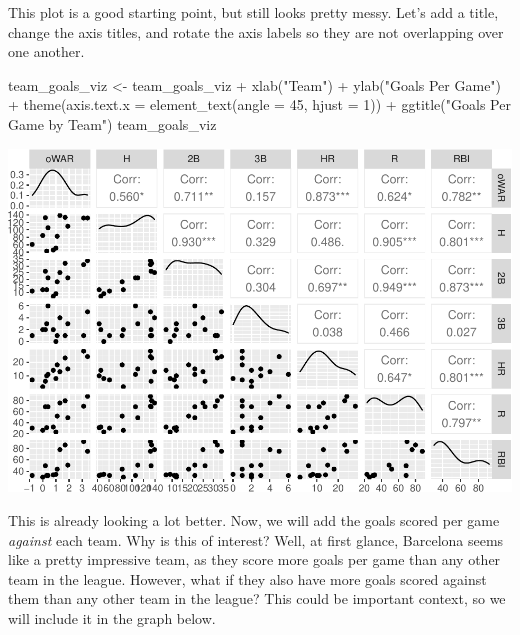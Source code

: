 \documentclass[
  11pt,
]{book}
\newenvironment{Shaded}{\begin{snugshade}}{\end{snugshade}}
\newcommand{\AttributeTok}[1]{\textcolor[rgb]{0.77,0.63,0.00}{#1}}
\newcommand{\DecValTok}[1]{\textcolor[rgb]{0.00,0.00,0.81}{#1}}
\newcommand{\FunctionTok}[1]{\textcolor[rgb]{0.00,0.00,0.00}{#1}}
\newcommand{\NormalTok}[1]{#1}
\newcommand{\OtherTok}[1]{\textcolor[rgb]{0.56,0.35,0.01}{#1}}
\newcommand{\SpecialCharTok}[1]{\textcolor[rgb]{0.00,0.00,0.00}{#1}}
\newcommand{\StringTok}[1]{\textcolor[rgb]{0.31,0.60,0.02}{#1}}
\theoremstyle{definition}
\theoremstyle{definition}
\theoremstyle{definition}
\theoremstyle{definition}
\theoremstyle{remark}
\begin{document}
This plot is a good starting point, but still looks pretty messy. Let's add a title, change the axis titles, and rotate the axis labels so they are not overlapping over one another.

\begin{Shaded}
\begin{Highlighting}[]
\NormalTok{team\_goals\_viz }\OtherTok{\textless{}{-}}\NormalTok{ team\_goals\_viz }\SpecialCharTok{+} \FunctionTok{xlab}\NormalTok{(}\StringTok{"Team"}\NormalTok{) }\SpecialCharTok{+} \FunctionTok{ylab}\NormalTok{(}\StringTok{"Goals Per Game"}\NormalTok{) }\SpecialCharTok{+} \FunctionTok{theme}\NormalTok{(}\AttributeTok{axis.text.x =} \FunctionTok{element\_text}\NormalTok{(}\AttributeTok{angle =} \DecValTok{45}\NormalTok{,}
    \AttributeTok{hjust =} \DecValTok{1}\NormalTok{)) }\SpecialCharTok{+} \FunctionTok{ggtitle}\NormalTok{(}\StringTok{"Goals Per Game by Team"}\NormalTok{)}
\NormalTok{team\_goals\_viz}
\end{Highlighting}
\end{Shaded}

\includegraphics{series_files/figure-latex/unnamed-chunk-12-1.pdf}

This is already looking a lot better. Now, we will add the goals scored per game \emph{against} each team. Why is this of interest? Well, at first glance, Barcelona seems like a pretty impressive team, as they score more goals per game than any other team in the league. However, what if they also have more goals scored against them than any other team in the league? This could be important context, so we will include it in the graph below.
\end{document}
